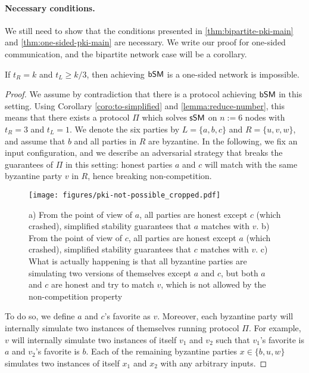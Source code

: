 \paragraph{Necessary conditions.} We still need to show that the conditions presented in \cref{thm:bipartite-pki-main} and \cref{thm:one-sided-pki-main} are necessary.
We write our proof for one-sided communication, and the bipartite network case will be a corollary.
\begin{lemma}\label{lemma:with-pki-one-sided-impossible}
If $t_R = k$ and $t_L \geq k/3$, then achieving $\textsf{bSM}$ is a one-sided network is impossible.
\end{lemma}
\begin{proof}
We assume by contradiction that there is a protocol achieving $\textsf{bSM}$ in this setting. Using Corollary \ref{coro:to-simplified} and \cref{lemma:reduce-number}, this means that there exists a protocol $\Pi$ which solves $\textsf{sSM}$ on $n := 6$ nodes with $t_R = 3$ and $t_L = 1$. We denote the six parties by  $L = \{a,b,c\}$ and $R = \{u,v,w\}$, and assume that $b$ and all parties in $R$ are byzantine. In the following, we fix an input configuration, and we describe an adversarial strategy that breaks the guarantees of $\Pi$ in this setting: honest parties $a$ and $c$ will match with the same byzantine party $v$ in $R$, hence breaking non-competition.

\begin{figure}[h]
\centering
\texttt{[image: figures/pki-not-possible\_cropped.pdf]}
\caption{a) From the point of view of $a$, all parties are honest except $c$ (which crashed), simplified stability guarantees that $a$ matches with $v$. b) From the point of view of $c$, all parties are honest except $a$ (which crashed), simplified stability guarantees that $c$ matches with $v$. c) What is actually happening is that all byzantine parties are simulating two versions of themselves except $a$ and $c$, but both $a$ and $c$ are honest and try to match $v$, which is not allowed by the non-competition property}

\end{figure}


To do so, we define $a$ and $c$'s favorite as $v$. Moreover, each byzantine party will internally simulate two instances of themselves running protocol $\Pi$. For example, $v$ will internally simulate two instances of itself $v_1$ and $v_2$ such that $v_1$'s favorite is $a$ and $v_2$'s favorite is $b$. Each of the remaining byzantine parties $x \in \{ b, u, w \}$ simulates two instances of itself $x_1$ and $x_2$ with any arbitrary inputs.


\end{proof}
